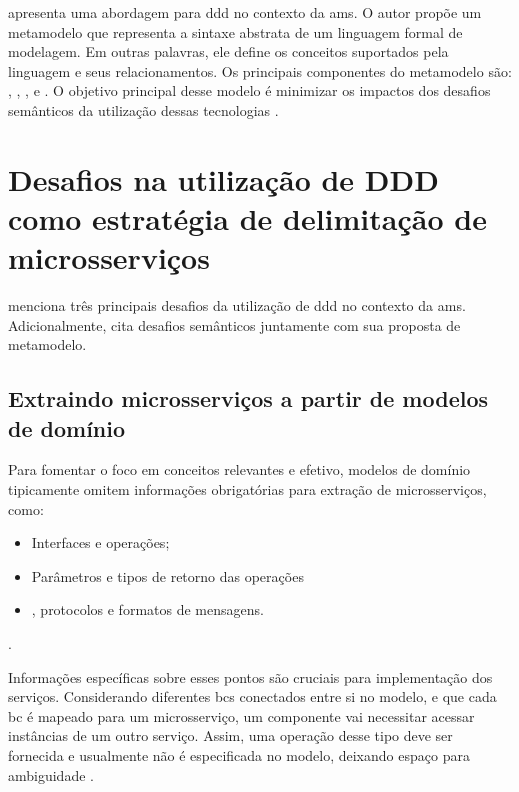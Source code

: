  apresenta uma abordagem para \acrshort{ddd} no contexto da \acrshort{ams}. O autor propõe um metamodelo que representa a sintaxe abstrata de um linguagem formal de modelagem. Em outras palavras, ele define os conceitos suportados pela linguagem e seus relacionamentos. Os principais componentes do metamodelo são: , , ,  e . O objetivo principal desse modelo é minimizar os impactos dos desafios semânticos da utilização dessas tecnologias \cite{Diepenbrock20171777}.

\section{Desafios na utilização de DDD como estratégia de delimitação de microsserviços}
 menciona três principais desafios da utilização de \acrshort{ddd} no contexto da \acrshort{ams}. Adicionalmente,  cita desafios semânticos juntamente com sua proposta de metamodelo.

\subsection{Extraindo microsserviços a partir de modelos de domínio}
Para fomentar o foco em conceitos relevantes e  efetivo, modelos de domínio tipicamente omitem informações obrigatórias para extração de microsserviços, como:
\begin{itemize}
    \item Interfaces e operações;
    \item Parâmetros e tipos de retorno das operações
    \item {}, protocolos e formatos de mensagens.
\end{itemize}
\cite{Rademacher201836}.

Informações específicas sobre esses pontos são cruciais para implementação dos serviços. Considerando diferentes \acrshort{bc}s conectados entre si no modelo, e que cada \acrshort{bc} é mapeado para um microsserviço, um componente vai necessitar acessar instâncias de um outro serviço. Assim, uma operação desse tipo deve ser fornecida e usualmente não é especificada no modelo, deixando espaço para ambiguidade \cite{Rademacher201836}.

